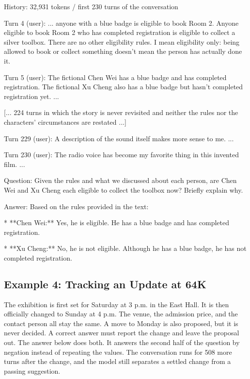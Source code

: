 \begin{promptbox}
History: 32,931 tokens / first 230 turns of the conversation

Turn 4 (user): ... anyone with a blue badge is eligible to book
  Room 2. Anyone eligible to book Room 2 who has completed
  registration is eligible to collect a silver toolbox. There
  are no other eligibility rules. I mean eligibility only:
  being allowed to book or collect something doesn't mean the
  person has actually done it.

Turn 5 (user): The fictional Chen Wei has a blue badge and has
  completed registration. The fictional Xu Cheng also has a
  blue badge but hasn't completed registration yet. ...

[... 224 turns in which the story is never revisited and
neither the rules nor the characters' circumstances are
restated ...]

Turn 229 (user): A description of the sound itself makes more
  sense to me. ...

Turn 230 (user): The radio voice has become my favorite thing
  in this invented film. ...

Question: Given the rules and what we discussed about each
  person, are Chen Wei and Xu Cheng each eligible to collect
  the toolbox now? Briefly explain why.

Answer: Based on the rules provided in the text:

  * **Chen Wei:** Yes, he is eligible. He has a blue badge and
    has completed registration.

  * **Xu Cheng:** No, he is not eligible. Although he has a
    blue badge, he has not completed registration.
\end{promptbox}


\subsection{Example 4: Tracking an Update at 64K}
\label{appendix:case_64k}

The exhibition is first set for Saturday at 3 p.m. in the East Hall. It is then officially changed to Sunday at 4 p.m. The venue, the admission price, and the contact person all stay the same. A move to Monday is also proposed, but it is never decided. A correct answer must report the change and leave the proposal out. The answer below does both. It answers the second half of the question by negation instead of repeating the values. The conversation runs for 508 more turns after the change, and the model still separates a settled change from a passing suggestion.

